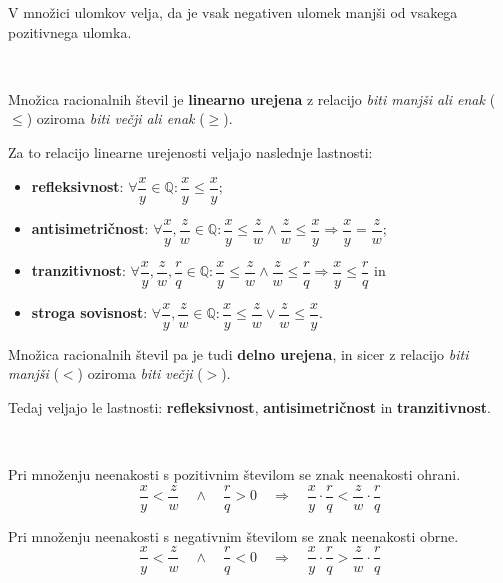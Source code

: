                     

                    V množici ulomkov velja, da je vsak negativen ulomek manjši od vsakega pozitivnega ulomka.


                    ~

                    Množica racionalnih števil je \textbf{linearno urejena} z relacijo \textit{biti manjši ali enak} ($\leq$) oziroma \textit{biti večji ali enak} ($\geq$). 
                    
                    Za to relacijo linearne urejenosti veljajo naslednje lastnosti:

                    \begin{itemize}
                        \item \textbf{refleksivnost}: $\forall \dfrac{x}{y}\in\mathbb{Q}: \dfrac{x}{y}\leq\dfrac{x}{y}$;
                        \item \textbf{antisimetričnost}: $\forall \dfrac{x}{y},\dfrac{z}{w}\in\mathbb{Q}: \dfrac{x}{y}\leq\dfrac{z}{w}  \land \dfrac{z}{w}\leq\dfrac{x}{y} \Rightarrow \dfrac{x}{y}=\dfrac{z}{w}$;
                        \item \textbf{tranzitivnost}: $\forall \dfrac{x}{y},\dfrac{z}{w},\dfrac{r}{q}\in\mathbb{Q}: \dfrac{x}{y}\leq\dfrac{z}{w}  \land \dfrac{z}{w}\leq\dfrac{r}{q} \Rightarrow \dfrac{x}{y}\leq\dfrac{r}{q}$ in 
                        \item \textbf{stroga sovisnost}: $\forall \dfrac{x}{y},\dfrac{z}{w}\in\mathbb{Q}: \dfrac{x}{y}\leq\dfrac{z}{w}  \lor \dfrac{z}{w}\leq\dfrac{x}{y}$.
                    \end{itemize}
    


                    Množica racionalnih števil pa je tudi \textbf{delno urejena}, in sicer z relacijo \textit{biti manjši} ($<$) oziroma \textit{biti večji} ($>$). 
                
                    Tedaj veljajo le lastnosti: \textbf{refleksivnost}, \textbf{antisimetričnost} in \textbf{tranzitivnost}.


                    ~

                    Pri množenju neenakosti s pozitivnim številom se znak neenakosti ohrani.
                    $$ \dfrac{x}{y}<\dfrac{z}{w} \quad \wedge \quad \dfrac{r}{q}>0 \quad \Rightarrow \quad \dfrac{x}{y}\cdot\dfrac{r}{q}<\dfrac{z}{w}\cdot\dfrac{r}{q} $$

                    

                    Pri množenju neenakosti s negativnim številom se znak neenakosti obrne.
                    $$ \dfrac{x}{y}<\dfrac{z}{w} \quad \wedge \quad \dfrac{r}{q}<0 \quad \Rightarrow \quad \dfrac{x}{y}\cdot\dfrac{r}{q}>\dfrac{z}{w}\cdot\dfrac{r}{q} $$

